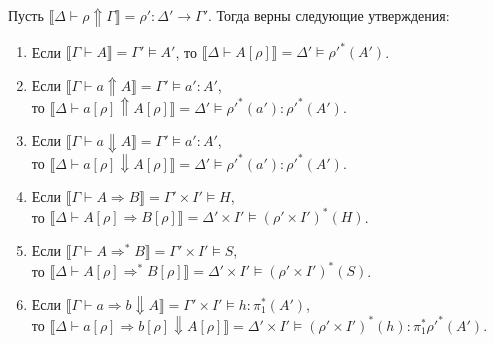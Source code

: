\documentclass{amsart}
\theoremstyle{definition}
\theoremstyle{remark}
\newcommand{\red}{\Rightarrow}
\renewcommand{\ll}{\llbracket}
\newcommand{\rr}{\rrbracket}
\numberwithin{figure}{section}
\begin{document}
\begin{lem}
Пусть $\ll \Delta \vdash \rho \Uparrow \Gamma \rr = \rho' : \Delta' \to \Gamma'$.
Тогда верны следующие утверждения:
\begin{enumerate}
\item Если $\ll \Gamma \vdash A \rr = \Gamma' \models A'$, то $\ll \Delta \vdash A[\rho] \rr = \Delta' \models \rho'^*(A')$.
\item Если $\ll \Gamma \vdash a \Uparrow A \rr = \Gamma' \models a' : A'$, \\
    то $\ll \Delta \vdash a[\rho] \Uparrow A[\rho] \rr = \Delta' \models \rho'^*(a') : \rho'^*(A')$.
\item Если $\ll \Gamma \vdash a \Downarrow A \rr = \Gamma' \models a' : A'$, \\
    то $\ll \Delta \vdash a[\rho] \Downarrow A[\rho] \rr = \Delta' \models \rho'^*(a') : \rho'^*(A')$.
\item Если $\ll \Gamma \vdash A \red B \rr = \Gamma' \times I' \models H$, \\
    то $\ll \Delta \vdash A[\rho] \red B[\rho] \rr = \Delta' \times I' \models (\rho' \times I')^*(H)$.
\item Если $\ll \Gamma \vdash A \red^* B \rr = \Gamma' \times I' \models S$, \\
    то $\ll \Delta \vdash A[\rho] \red^* B[\rho] \rr = \Delta' \times I' \models (\rho' \times I')^*(S)$.
\item Если $\ll \Gamma \vdash a \red b \Downarrow A \rr = \Gamma' \times I' \models h : \pi_1^*(A')$, \\
    то $\ll \Delta \vdash a[\rho] \red b[\rho] \Downarrow A[\rho] \rr = \Delta' \times I' \models (\rho' \times I')^*(h) : \pi_1^* \rho'^*(A')$.
\end{enumerate}
\end{lem}
\end{document}
